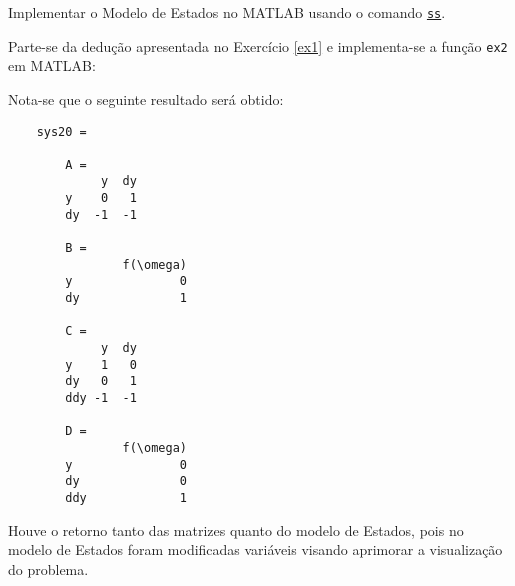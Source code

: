 \documentclass{article}
\begin{document}
\newpage\begin{exercise}\label{ex2}
    Implementar o Modelo de Estados no MATLAB usando o comando \href{https://www.mathworks.com/help/control/ref/ss.html}{\texttt{ss}}.
\end{exercise}
\begin{resolution}
    Parte-se da dedução apresentada no Exercício \ref{ex1} e implementa-se a função \texttt{ex2} em MATLAB:
    \begin{scriptsize}
        \myMatlab
    \end{scriptsize}
    Nota-se que o seguinte resultado será obtido:
    \begin{scriptsize}
        \myMatlab\begin{lstlisting}
    sys20 =
        
        A = 
             y  dy
        y    0   1
        dy  -1  -1
        
        B = 
                f(\omega)
        y               0
        dy              1
        
        C = 
             y  dy
        y    1   0
        dy   0   1
        ddy -1  -1
        
        D = 
                f(\omega)
        y               0
        dy              0
        ddy             1
    \end{lstlisting}
    \end{scriptsize}
    Houve o retorno tanto das matrizes quanto do modelo de Estados, pois no modelo de Estados foram modificadas variáveis visando aprimorar a visualização do problema.
\end{resolution}
\end{document}
